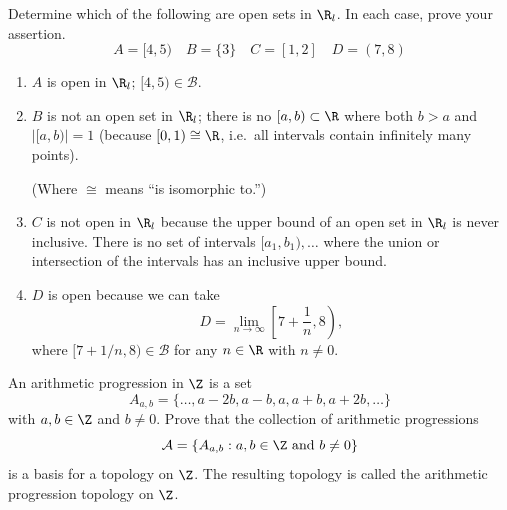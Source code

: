 \documentclass[twocolumn, noxcolor, maketitle]{rbt-mathnotes-hw}
\def\basis{\mathcal{B}}
\begin{document}
\begin{problem}[1.12]
  Determine which of the following are open sets in $\R_l$. In each case, prove
  your assertion.
  \[ A = [4,5)
    \quad B = \{3\}
    \quad C = [1,2]
    \quad D = (7,8) \]
\end{problem}
\begin{enumerate}
  \item $A$ is open in $\R_l$; $[4,5) \in \basis$.
  \item $B$ is not an open set in $\R_l$; there is no $[a, b) \subset \R$ where
    both $b > a$ and $|[a, b)| = 1$ (because $[0,1) \cong \R$, i.e.~all
    intervals contain infinitely many points).

    (Where $\cong$ means ``is isomorphic to.'')
  \item $C$ is not open in $\R_l$ because the upper bound of an open set in
    $\R_l$ is never inclusive. There is no set of intervals $[a_1, b_1), \dots$
    where the union or intersection of the intervals has an inclusive upper bound.
  \item $D$ is open because we can take
    \[ D = \lim_{n\to\infty} \left[7 + \frac{1}{n}, 8\right), \]
    where $[7 + 1/n, 8) \in \basis$ for any $n \in \R$ with $n \ne 0$.
\end{enumerate}

\pagebreak
\begin{problem}[1.15]
  An arithmetic progression in $\Z$ is a set
  \[ A_{a,b} = \{\dots, a - 2b, a - b, a, a + b, a + 2b, \dots\} \]
  with $a,b \in \Z$ and $b \ne 0$. Prove that the collection of arithmetic
  progressions
  \[ \mathcal{A} = \{ A_{a,b} : a, b \in \Z \text{ and } b \ne 0 \} \]
  is a basis for a topology on $\Z$. The resulting topology is called the
  arithmetic progression topology on $\Z$.
\end{problem}
\end{document}
